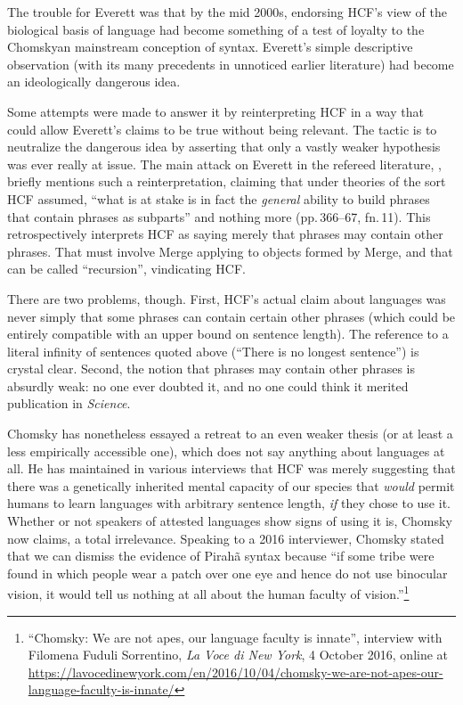 \documentclass[output=paper,colorlinks,citecolor=brown
]{langscibook}
\begin{document}
The trouble for Everett was that by the mid 2000s, endorsing HCF's view
of the biological basis of language had become something of a test of
loyalty to the Chomskyan mainstream conception of syntax. Everett's
simple descriptive observation (with its many precedents in unnoticed
earlier literature) had become an ideologically dangerous idea.

Some attempts were made to answer it by reinterpreting HCF in a way
that could allow Everett's claims to be true without being relevant.
The tactic is to neutralize the dangerous idea by asserting that only
a vastly weaker hypothesis was ever really at issue. The main attack
on Everett in the refereed literature, \citet{NevPesRod09a}, briefly
mentions such a reinterpretation, claiming that under theories of the
sort HCF assumed, ``what is at stake is in fact the \emph{general}
ability to build phrases that contain phrases as subparts'' and nothing
more (pp.\,366--67, fn.\,11). This retrospectively interprets HCF as
saying merely that phrases may contain other phrases. That must involve
Merge applying to objects formed by Merge, and that can be called
``recursion'', vindicating HCF.

There are two problems, though. First, HCF's actual claim about
languages was never simply that some phrases can contain certain other
phrases (which could be entirely compatible with an upper bound on
sentence length). The reference to a literal infinity of sentences
quoted above (``There is no longest sentence'') is crystal clear. Second,
the notion that phrases may contain other phrases is absurdly weak:
no one ever doubted it, and no one could think it merited publication
in \textit{Science}.

Chomsky has nonetheless essayed a retreat to an even weaker thesis
(or at least a less empirically accessible one), which does not say
anything about languages at all. He has maintained in various interviews
that HCF was merely suggesting that there was a genetically inherited
mental capacity of our species that \emph{would} permit humans to
learn languages with arbitrary sentence length, \emph{if} they chose
to use it. Whether or not speakers of attested languages show signs
of using it is, Chomsky now claims, a total irrelevance. Speaking to
a 2016 interviewer, Chomsky stated that we can dismiss the evidence of
Pirahã syntax because ``if some tribe were found in which people
wear a patch over one eye and hence do not use binocular vision, it
would tell us nothing at all about the human faculty of vision.''\footnote{%
   ``Chomsky: We are not apes, our language faculty is innate'', interview
   with Filomena Fuduli Sorrentino, \textit{La Voce di New York},
   4 October 2016, online at
   \url{https://lavocedinewyork.com/en/2016/10/04/chomsky-we-are-not-apes-our-language-faculty-is-innate/}}
\end{document}
